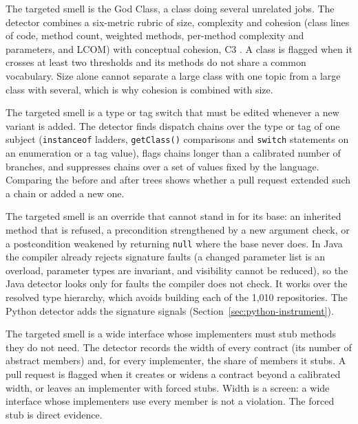 \begin{description}[leftmargin=1.4cm,style=nextline]
\item[SRP (Single Responsibility).] The targeted smell is the God Class, a class doing several
unrelated jobs. The detector combines a six-metric rubric of size, complexity and cohesion (class
lines of code, method count, weighted methods, per-method complexity and parameters, and LCOM) with
conceptual cohesion, C3 \citep{marcus2008c3}. A class is flagged when it crosses at least two
thresholds and its methods do not share a common vocabulary. Size alone cannot separate a large
class with one topic from a large class with several, which is why cohesion is combined with size.

\item[OCP (Open/Closed).] The targeted smell is a type or tag switch that must be edited whenever a
new variant is added. The detector finds dispatch chains over the type or tag of one subject
(\texttt{instanceof} ladders, \texttt{getClass()} comparisons and \texttt{switch} statements on an
enumeration or a tag value), flags chains longer than a calibrated number of branches, and
suppresses chains over a set of values fixed by the language. Comparing the before and after trees
shows whether a pull request extended such a chain or added a new one.

\item[LSP (Liskov Substitution).] The targeted smell is an override that cannot stand in for its
base: an inherited method that is refused, a precondition strengthened by a new argument check, or a
postcondition weakened by returning \texttt{null} where the base never does. In Java the compiler
already rejects signature faults (a changed parameter list is an overload, parameter types are
invariant, and visibility cannot be reduced), so the Java detector looks only for faults the compiler
does not check. It works over the resolved type hierarchy, which avoids building each of the 1{,}010
repositories. The Python detector adds the signature signals
(Section~\ref{sec:python-instrument}).

\item[ISP (Interface Segregation).] The targeted smell is a wide interface whose implementers must
stub methods they do not need. The detector records the width of every contract (its number of
abstract members) and, for every implementer, the share of members it stubs. A pull request is
flagged when it creates or widens a contract beyond a calibrated width, or leaves an implementer
with forced stubs. Width is a screen: a wide interface whose implementers use every member is not a
violation. The forced stub is direct evidence.


\end{description}
